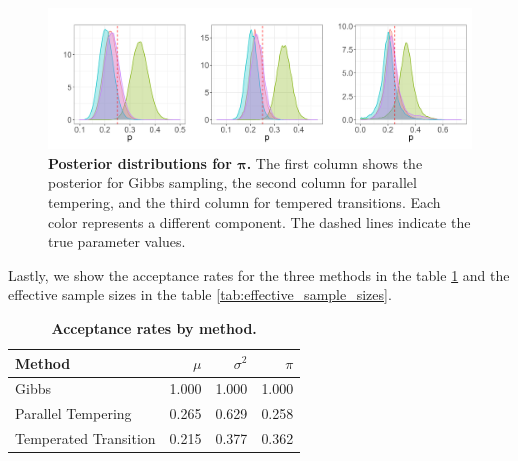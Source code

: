 \documentclass[11pt]{article}
\newcommand{\bpi}{\boldsymbol{\pi}}
\begin{document}
\begin{figure}[!ht]
    \centering
    \includegraphics[scale=0.55]{figures/post_p_random_beta.png}
    \caption{\textbf{Posterior distributions for $\bpi$.} The first column shows the posterior for Gibbs sampling,
    the second column for parallel tempering, and the third column for tempered transitions. Each color
    represents a different component. The dashed lines indicate the true parameter values.}
    \label{fig:posterior_pi}
\end{figure}

Lastly, we show the acceptance rates for the three methods in the table \ref{tab:acceptance_rates} and 
the effective sample sizes in the table \ref{tab:effective_sample_sizes}.

\begin{table}[!ht]

\caption{\textbf{Acceptance rates by method.}}
\centering
\begin{tabular}[t]{lrrr}
\toprule
Method & $\mu$ & $\sigma^2$ & $\pi$\\
\midrule
Gibbs & 1.000 & 1.000 & 1.000\\
Parallel Tempering & 0.265 & 0.629 & 0.258\\
Temperated Transition & 0.215 & 0.377 & 0.362\\
\bottomrule
\end{tabular}
\label{tab:acceptance_rates}
\end{table}
\end{document}
